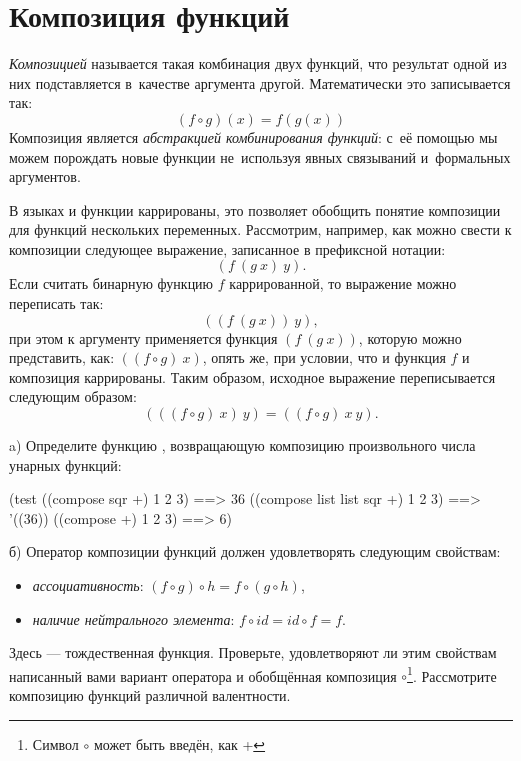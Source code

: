 \section{Композиция функций}%
%
\emph{Композицией} называется такая комбинация двух функций, что результат одной из них подставляется в~качестве аргумента другой. Математически это записывается так:$$(f \circ g)(x) = f(g(x))$$
Композиция является \emph{абстракцией комбинирования функций}: с~её помощью мы можем порождать новые функции не~используя явных связываний и~формальных аргументов.

В языках \Scheme и  функции каррированы, это позволяет обобщить понятие композиции  для функций нескольких переменных. Рассмотрим, например, как можно свести к композиции следующее выражение, записанное в префиксной нотации:
$$(f~(g~x)~y).$$
Если считать бинарную функцию $f$ каррированной, то выражение можно переписать так:
$$((f~(g~x))~y),$$
при этом к аргументу  применяется функция $(f~(g~x))$, которую можно представить, как: $((f\circ g)~x)$, опять же, при условии, что и функция $f$ и композиция каррированы. Таким образом, исходное выражение переписывается следующим образом: $$(((f \circ g)~x)~y) = ((f \circ g)~x~y).$$

\newpage
\begin{Assignment}
a) Определите функцию , возвращающую композицию произвольного числа унарных функций:
\begin{Specification}
(test
  ((compose sqr +) 1 2 3)           ==> 36
  ((compose list list sqr +) 1 2 3) ==> '((36))
  ((compose +) 1 2 3)               ==> 6)
\end{Specification}

б) Оператор композиции функций должен удовлетворять следующим свойствам:
\begin{itemize}
  \item \emph{ассоциативность}: $(f \circ g) \circ h = f \circ (g \circ h)$,
  \item \emph{наличие нейтрального элемента}: $f \circ id = id \circ f = f$.
\end{itemize}
Здесь  --- тождественная функция.
Проверьте, удовлетворяют ли этим свойствам написанный вами вариант оператора  и обобщённая композиция $\circ$\footnote{Символ $\circ$ может быть введён, как \s{\\circ} +  \s{\\}}. Рассмотрите  композицию функций различной валентности.
\end{Assignment}



